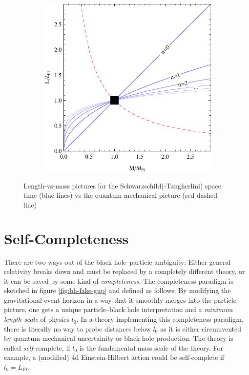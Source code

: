 \documentclass[12pt,a4paper]{report}
\numberwithin{equation}{chapter}
\begin{document}
\begin{figure}
\begin{subfigure}{0.5\textwidth}
\includegraphics[width=\textwidth]{figures/completeness-STM.pdf}
\end{subfigure}
\caption[Illustration about the black hole and particle phases]{Length-vs-mass pictures for the Schwarzschild(-Tangherlini) space time (blue lines) vs the quantum mechanical picture (red dashed line)}\label{fig:bh-duality-SS}
\end{figure}

\section{Self-Completeness}
There are two ways out of the black hole--particle ambiguity: Either general relativity breaks down and must be replaced by a completely different theory, or it can be saved by some kind of \emph{completeness}. The completeness paradigm is sketched in figure \ref{fig:bh-fake-gup} and defined as follows: By modifying the gravitational event horizon in a way that it smoothly merges into the particle picture, one gets a unique particle--black hole interpretation and a \emph{minimum length scale} of physics $l_0$. In a theory implementing this completeness paradigm, there is literally no way to probe distances below $l_0$ as it is either circumvented by quantum mechanical uncertainity or black hole production. The theory is called \emph{self}-complete, if $l_0$ is the fundamental mass scale of the theory. For example, a (modified) 4d Einstein-Hilbert action could be self-complete if $l_0=L_\text{Pl}$.
\end{document}
